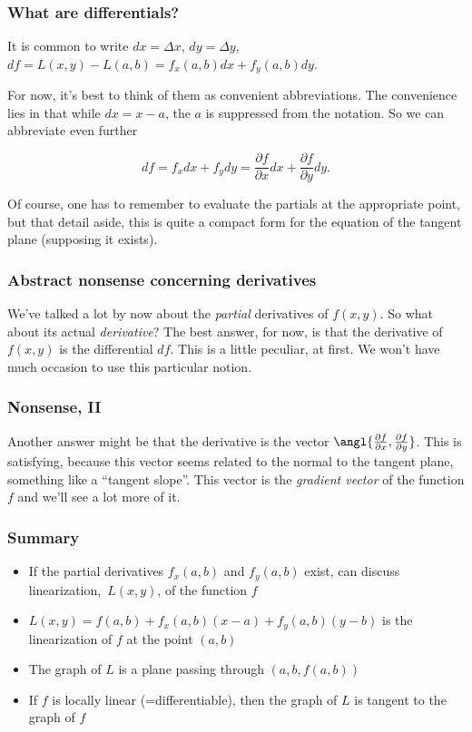 \documentclass[11pt,ignorenonframetext,aspectratio=169,xcolor={svgnames}]{beamer}
\begin{document}
\begin{frame}\frametitle{What are differentials?}

It is common to write $dx = \Delta x$, $dy = \Delta y$,
$df = L(x,y) - L(a,b) = f_x(a,b) dx + f_y(a,b) dy$.

For now, it's best to think of them as convenient abbreviations. The
convenience lies in that while $dx = x-a$, the $a$ is suppressed from
the notation. So we can abbreviate even further

\[ df = f_x dx + f_y dy = \frac{\partial f}{\partial x} dx + \frac{\partial f}{\partial y} dy. \]

Of course, one has to remember to evaluate the partials at the
appropriate point, but that detail aside, this is quite a compact form
for the equation of the tangent plane (supposing it exists).

\end{frame}

\begin{frame}\frametitle{Abstract nonsense concerning derivatives}

We've talked a lot by now about the \emph{partial} derivatives of
$f(x,y)$. So what about its actual \emph{derivative}? The best answer,
for now, is that the derivative of $f(x,y)$ is the differential $df$.
This is a little peculiar, at first. We won't have much occasion to use
this particular notion.

\end{frame}

\begin{frame}\frametitle{Nonsense, II}

Another answer might be that the derivative is the vector
$\angl{\frac{\partial f}{\partial x},\frac{\partial f}{\partial y}}$.
This is satisfying, because this vector seems related to the normal to
the tangent plane, something like a ``tangent slope''. This vector is
the \emph{gradient vector} of the function $f$ and we'll see a lot more
of it.

\end{frame}

\begin{frame}\frametitle{Summary}

\begin{itemize}

\item
  If the partial derivatives $f_x(a,b)$ and $f_y(a,b)$ exist, can
  discuss linearization,~$L(x,y)$, of the function $f$
  \pause
\item
  $L(x,y) = f(a,b) + f_x(a,b)(x-a) + f_y(a,b)(y-b)$ is the linearization
  of $f$ at the point $(a,b)$
  \pause
\item
  The graph of $L$ is a plane passing through $(a,b,f(a,b))$
  \pause
\item
  If $f$ is locally linear (=differentiable), then the graph of $L$ is
  tangent to the graph of $f$
\end{itemize}

\end{frame}
\end{document}
